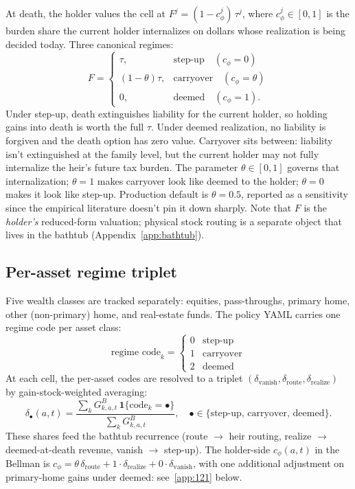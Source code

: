 \documentclass[11pt]{article}
\newcommand{\GB}{G^{B}}
\begin{document}
At death, the holder values the cell at $F^j = (1 - c_\phi^j)\,\tau^j$,
where $c_\phi^j \in [0, 1]$ is the burden share the current holder
internalizes on dollars whose realization is being decided today. Three
canonical regimes:
\begin{equation}
F = \begin{cases}
  \tau,             & \text{step-up}     \quad (c_\phi = 0)        \\
  (1-\theta)\tau,   & \text{carryover}   \quad (c_\phi = \theta)   \\
  0,                & \text{deemed}      \quad (c_\phi = 1).
\end{cases}
\end{equation}
Under step-up, death extinguishes liability for the current holder, so
holding gains into death is worth the full $\tau$. Under deemed
realization, no liability is forgiven and the death option has zero
value. Carryover sits between: liability isn't extinguished at the
family level, but the current holder may not fully internalize the
heir's future tax burden. The parameter $\theta \in [0, 1]$ governs that
internalization; $\theta = 1$ makes carryover look like deemed to the
holder; $\theta = 0$ makes it look like step-up. Production default is
$\theta = 0.5$, reported as a sensitivity since the empirical literature
doesn't pin it down sharply. Note that $F$ is the \emph{holder's}
reduced-form valuation; physical stock routing is a separate object that
lives in the bathtub (Appendix~\ref{app:bathtub}).

\subsection{Per-asset regime triplet}

Five wealth classes are tracked separately: equities, pass-throughs,
primary home, other (non-primary) home, and real-estate funds. The policy
YAML carries one regime code per asset class:
\begin{equation*}
\text{regime code}_k =
  \begin{cases} 0 & \text{step-up}\\ 1 & \text{carryover}\\ 2 & \text{deemed}\end{cases}
\end{equation*}
At each cell, the per-asset codes are resolved to a triplet
$(\delta_{\text{vanish}}, \delta_{\text{route}}, \delta_{\text{realize}})$
by gain-stock-weighted averaging:
\begin{equation}
\delta_{\bullet}(a, t) = \frac{\sum_{k} \GB_{k,a,t}\,\mathbf{1}\{\text{code}_k = \bullet\}}
                              {\sum_{k} \GB_{k,a,t}},
\quad \bullet \in \{\text{step-up, carryover, deemed}\}.
\end{equation}
These shares feed the bathtub recurrence (route $\to$ heir routing, realize
$\to$ deemed-at-death revenue, vanish $\to$ step-up). The holder-side
$c_\phi(a,t)$ in the Bellman is
$c_\phi = \theta\,\delta_{\text{route}} + 1\cdot\delta_{\text{realize}}
        + 0 \cdot \delta_{\text{vanish}}$, with one additional adjustment
on primary-home gains under deemed: see~\ref{app:121} below.
\end{document}
